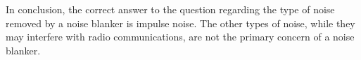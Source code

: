 In conclusion, the correct answer to the question regarding the type of noise removed by a noise blanker is impulse noise. The other types of noise, while they may interfere with radio communications, are not the primary concern of a noise blanker.

